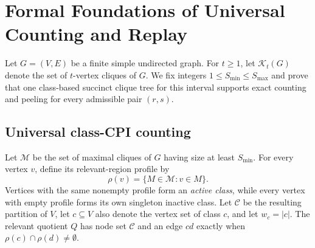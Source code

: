
\section{Formal Foundations of Universal Counting and Replay}
\label{sec:formal-foundations}

Let $G=(V,E)$ be a finite simple undirected graph.
%
For $t\geq 1$, let $\mathcal K_t(G)$ denote the set of $t$-vertex cliques of $G$.
%
We fix integers $1\leq S_{\min}\leq S_{\max}$ and prove that one class-based succinct clique tree for this interval supports exact counting and peeling for every admissible pair $(r,s)$.

\subsection{Universal class-CPI counting}
\label{subsec:universal-class-cpi}

Let $\mathcal M$ be the set of maximal cliques of $G$ having size at least $S_{\min}$.
%
For every vertex $v$, define its relevant-region profile by
\[
\rho(v)=\{M\in\mathcal M:v\in M\}.
\]
Vertices with the same nonempty profile form an \emph{active class}, while every vertex with empty profile forms its own singleton inactive class.
%
Let $\mathcal C$ be the resulting partition of $V$, let $c\subseteq V$ also denote the vertex set of class $c$, and let $w_c=|c|$.
%
The relevant quotient $Q$ has node set $\mathcal C$ and an edge $cd$ exactly when $\rho(c)\cap\rho(d)\neq\emptyset$.

